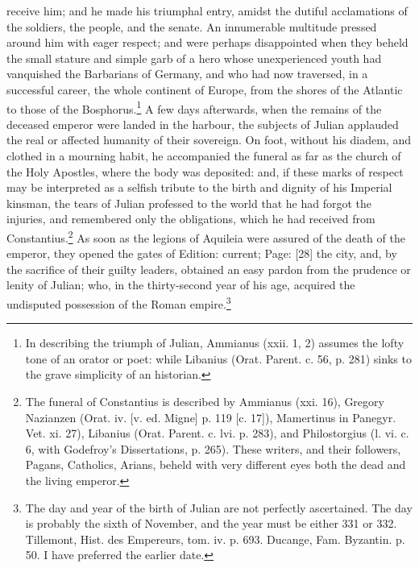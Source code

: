 receive him; and he made his triumphal entry, amidst the dutiful acclamations of the soldiers, the people, and the senate. An innumerable multitude pressed around him with eager respect; and were perhaps disappointed when they beheld the small stature and simple garb of a hero whose unexperienced youth had vanquished the Barbarians of Germany, and who had now traversed, in a successful career, the whole continent of Europe, from the shores of the Atlantic to those of the Bosphorus.\footnote{In describing the triumph of Julian, Ammianus (xxii. 1, 2) assumes the lofty tone of an orator or poet: while Libanius (Orat. Parent. c. 56, p. 281) sinks to the grave simplicity of an historian.} A few days afterwards, when the remains of the deceased emperor were landed in the harbour, the subjects of Julian applauded the real or affected humanity of their sovereign. On foot, without his diadem, and clothed in a mourning habit, he accompanied the funeral as far as the church of the Holy Apostles, where the body was deposited: and, if these marks of respect may be interpreted as a selfish tribute to the birth and dignity of his Imperial kinsman, the tears of Julian professed to the world that he had forgot the injuries, and remembered only the obligations, which he had received from Constantius.\footnote{The funeral of Constantius is described by Ammianus (xxi. 16), Gregory Nazianzen (Orat. iv. [v. ed. Migne] p. 119 [c. 17]), Mamertinus in Panegyr. Vet. xi. 27), Libanius (Orat. Parent. c. lvi. p. 283), and Philostorgius (l. vi. c. 6, with Godefroy\texthebrew{}’s Dissertations, p. 265). These writers, and their followers, Pagans, Catholics, Arians, beheld with very different eyes both the dead and the living emperor.} As soon as the legions of Aquileia were assured of the death of the emperor, they opened the gates of Edition: current; Page: [28] the city, and, by the sacrifice of their guilty leaders, obtained an easy pardon from the prudence or lenity of Julian; who, in the thirty-second year of his age, acquired the undisputed possession of the Roman empire.\footnote{The day and year of the birth of Julian are not perfectly ascertained. The day is probably the sixth of November, and the year must be either 331 or 332. Tillemont, Hist. des Empereurs, tom. iv. p. 693. Ducange, Fam. Byzantin. p. 50. I have preferred the earlier date.}

